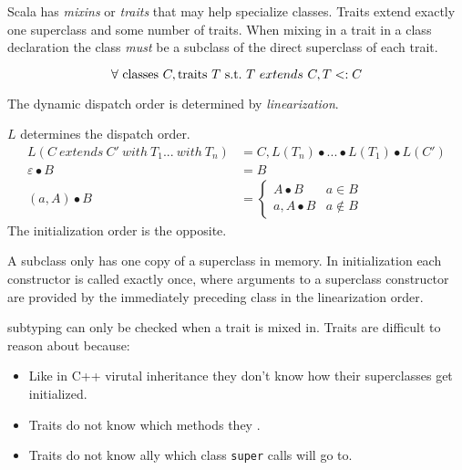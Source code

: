 \documentclass{article}
\begin{document}
Scala has \textit{mixins} or \textit{traits} that may help specialize classes. Traits extend exactly one superclass and some number of traits. When mixing in a trait in a class declaration the class \textit{must} be a subclass of the direct superclass of each trait.

\begin{remark}\label{remark:linearremark}
$$\forall ~ \text{classes} ~ C, \text{traits} ~ T ~ \text{s.t.} ~ T ~ extends ~ C, T <: C$$
\end{remark}

The dynamic dispatch order is determined by \textit{linearization}.

\begin{definition}[Linearization]
$L$ determines the dispatch order.
\begin{align} 
L(C ~ extends ~ C' ~ with ~ T_1 ... ~ with ~ T_n) &=  C, L(T_n) \bullet ... \bullet L(T_1) \bullet L(C') \\
\varepsilon \bullet B &= B \\
(a, A) \bullet B &=
\begin{cases}
A \bullet B & a \in B \\
a, A \bullet B & a \notin B
\end{cases}
\end{align}
The initialization order is the opposite.
\end{definition}


A subclass only has one copy of a superclass in memory. In initialization each constructor is called exactly once, where arguments to a superclass constructor are provided by the immediately preceding class in the linearization order.

\behavioral{} subtyping can only be checked when a trait is mixed in. Traits are difficult to reason about because:
\begin{itemize}
\item Like in C++ virutal inheritance they don't know how their superclasses get initialized.
\item Traits do not know which methods they \override{}.
\item Traits do not know \static{}ally which class \texttt{super} calls will go to.
\end{itemize}
\end{document}
